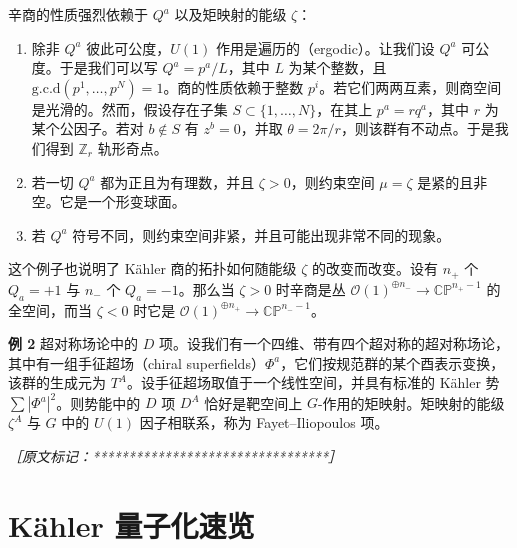 辛商的性质强烈依赖于 $Q^a$ 以及矩映射的能级 $\zeta$：

\begin{enumerate}[label={\alph*.)},leftmargin=2.4em,itemsep=2pt]
  \item 除非 $Q^a$ 彼此可公度，$U(1)$ 作用是遍历的（ergodic）。让我们设 $Q^a$ 可公度。于是我们可以写 $Q^a=p^a/L$，其中 $L$ 为某个整数，且 $\mathrm{g.c.d}(p^1,\dots,p^N)=1$。商的性质依赖于整数 $p^i$。若它们两两互素，则商空间是光滑的。然而，假设存在子集 $S\subset\{1,\dots,N\}$，在其上 $p^a=rq^a$，其中 $r$ 为某个公因子。若对 $b\notin S$ 有 $z^b=0$，并取 $\theta=2\pi/r$，则该群有不动点。于是我们得到 $\mathbb{Z}_r$ 轨形奇点。
  \item 若一切 $Q^a$ 都为正且为有理数，并且 $\zeta>0$，则约束空间 $\mu=\zeta$ 是紧的且非空。它是一个形变球面。
  \item 若 $Q^a$ 符号不同，则约束空间非紧，并且可能出现非常不同的现象。
\end{enumerate}

这个例子也说明了 Kähler 商的拓扑如何随能级 $\zeta$ 的改变而改变。设有 $n_+$ 个 $Q_a=+1$ 与 $n_-$ 个 $Q_a=-1$。那么当 $\zeta>0$ 时辛商是丛 $\mathcal{O}(1)^{\oplus n_-}\to\mathbb{CP}^{n_+-1}$ 的全空间，而当 $\zeta<0$ 时它是 $\mathcal{O}(1)^{\oplus n_+}\to\mathbb{CP}^{n_--1}$。

\textbf{例 2} 超对称场论中的 $D$ 项。设我们有一个四维、带有四个超对称的超对称场论，其中有一组手征超场（chiral superfields）$\Phi^a$，它们按规范群的某个酉表示变换，该群的生成元为 $T^A$。设手征超场取值于一个线性空间，并具有标准的 Kähler 势 $\sum|\Phi^a|^2$。则势能中的 $D$ 项 $D^A$ 恰好是靶空间上 $G$-作用的矩映射。矩映射的能级 $\zeta^A$ 与 $G$ 中的 $U(1)$ 因子相联系，称为 Fayet–Iliopoulos 项。

{\small\itshape ［原文标记：*********************************］}

\section{Kähler 量子化速览} %

